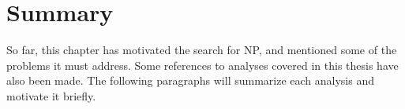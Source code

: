 \section{Summary}

So far, this chapter has motivated the search for NP, and mentioned some of the problems it must
address.
Some references to analyses covered in this thesis have also been made.
The following paragraphs will summarize each analysis and motivate it briefly.












